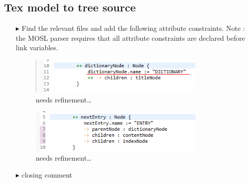 \newpage
\hypertarget{m2ttex}{}
\subsection{Tex model to tree source}
\texHeader

\begin{itemize}

\item[$\blacktriangleright$] Find the relevant files and add the following attribute constraints. Note : the MOSL parser requires that all attribute constraints
are declared before link variables.

\begin{figure}[htp]
\begin{center}
  \includegraphics[width=0.8\textwidth]{eclipse_NodeToDictionaryRule_updated}
  \caption[labelInTOC]{needs refinement\ldots}
  \label{eclipse:generatedBkwrdMdl}
\end{center}
\end{figure}

\begin{figure}[htp]
\begin{center}
  \includegraphics[width=0.8\textwidth]{eclipse_ForAllEntryRule_updated}
  \caption[labelInTOC]{needs refinement\ldots}
  \label{eclipse:generatedBkwrdMdl}
\end{center}
\end{figure} 

\item[$\blacktriangleright$] closing comment

\end{itemize}
